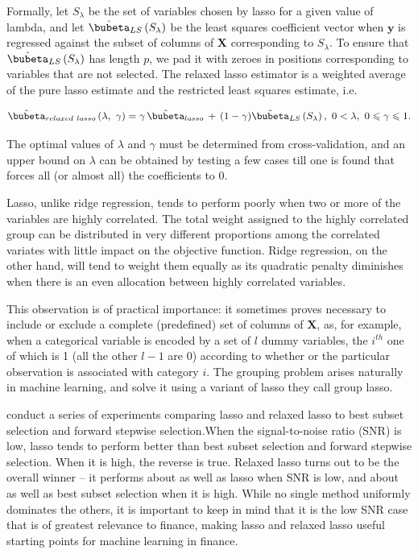 \documentclass[graybox,envcountchap,sectrefs]{svmono}\usepackage[]{graphicx}\usepackage[]{xcolor}
\begin{document}
\begin{appendices}
Formally, let $S_{\lambda}$ be the set of variables chosen by lasso
for a given value of lambda, and let $\hat{\bubeta}_{LS}\left(S_{\lambda}\right)$
be the least squares coefficient vector when $\mathbf{y}$ is regressed
against the subset of columns of $\mathbf{X}$ corresponding to $S_{\lambda}$.
To ensure that $\hat{\bubeta}_{LS}\left(S_{\lambda}\right)$ has length
$p$, we pad it with zeroes in positions corresponding to variables
that are not selected. The relaxed lasso estimator is a weighted average
of the pure lasso estimate and the restricted least squares estimate,
i.e.

\begin{equation}
\hat{\bubeta}_{relaxed\ lasso}\left(\lambda,\ \gamma\right)=\gamma\,\hat{\bubeta}_{lasso}\,+\,(1-\gamma)\hat{\bubeta}_{LS}\left(S_{\lambda}\right),\ 0<\lambda,\ 0\leqslant\gamma\leqslant1.\label{eq:RelaxedLasso}
\end{equation}

The optimal values of $\lambda$ and $\gamma$ must be determined
from cross-validation, and an upper bound on $\lambda$ can be obtained
by testing a few cases till one is found that forces all (or almost
all) the coefficients to 0.

Lasso, unlike ridge regression, tends to perform poorly when two or
more of the variables are highly correlated. The total weight assigned
to the highly correlated group can be distributed in very different
proportions among the correlated variates with little impact on the
objective function. Ridge regression, on the other hand, will tend
to weight them equally as its quadratic penalty diminishes when there
is an even allocation between highly correlated variables.

This observation is of practical importance: it sometimes proves necessary
to include or exclude a complete (predefined) set of columns of $\mathbf{X}$,
as, for example, when a categorical variable is encoded by a set of
$l$ dummy variables, the $i^{th}$ one of which is 1 (all the other
$l-1$ are 0) according to whether or the particular observation is
associated with category $i$. The grouping problem arises naturally
in machine learning, and \citet{YuanLin2006} solve it using a variant
of lasso they call group lasso.

\citet{HastieTibshiraniTibshirani2020} conduct a series of experiments
comparing lasso and relaxed lasso to best subset selection and forward
stepwise selection.When the signal-to-noise ratio (SNR) is low, lasso
tends to perform better than best subset selection and forward stepwise
selection. When it is high, the reverse is true. Relaxed lasso turns
out to be the overall winner -- it performs about as well as lasso
when SNR is low, and about as well as best subset selection when it
is high. While no single method uniformly dominates the others, it
is important to keep in mind that it is the low SNR case that is of
greatest relevance to finance, making lasso and relaxed lasso useful
starting points for machine learning in finance.


\end{appendices}
\end{document}
